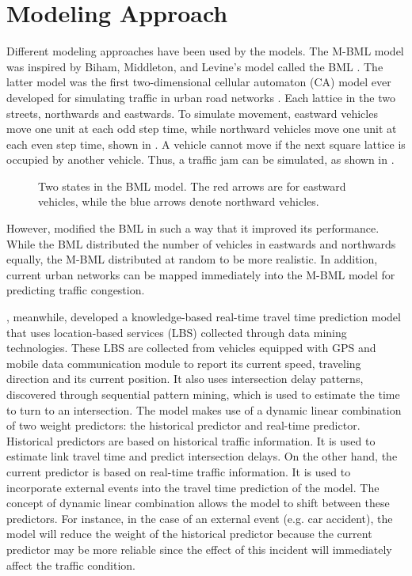 \section{Modeling Approach}
Different modeling approaches have been used by the models. The M-BML model was inspired by Biham, Middleton, and Levine’s model called the BML . The latter model was the first two-dimensional cellular automaton (CA) model ever developed for simulating traffic in urban road networks . Each lattice in the two streets, northwards and eastwards. To simulate movement, eastward vehicles move one unit at each odd step time, while northward vehicles move one unit at each even step time, shown in . A vehicle cannot move if the next square lattice is occupied by another vehicle. Thus, a traffic jam can be simulated, as shown in . 

\begin{figure}[h]
  	\centering
    	\captionsetup{justification=centering}
  	\hfill
  	\caption{Two states in the BML model. The red arrows are for eastward vehicles, while the blue arrows denote northward vehicles.}
\end{figure}


However,  modified the BML in such a way that it improved its performance. While the BML distributed the number of vehicles in eastwards and northwards equally, the M-BML distributed at random to be more realistic. In addition, current urban networks can be mapped immediately into the M-BML model for predicting traffic congestion.

, meanwhile, developed a knowledge-based real-time travel time prediction model that uses location-based services (LBS) collected through data mining technologies. These LBS are collected from vehicles equipped with GPS and mobile data communication module to report its current speed, traveling direction and its current position. It also uses intersection delay patterns, discovered through sequential pattern mining, which is used to estimate the time to turn to an intersection. The model makes use of a dynamic linear combination of two weight predictors: the historical predictor and real-time predictor. Historical predictors are based on historical traffic information. It is used to estimate link travel time and predict intersection delays. On the other hand, the current predictor is based on real-time traffic information. It is used to incorporate external events into the travel time prediction of the model. The concept of dynamic linear combination allows the model to shift between these predictors. For instance, in the case of an external event (e.g. car accident), the model will reduce the weight of the historical predictor because the current predictor may be more reliable since the effect of this incident will immediately affect the traffic condition.

